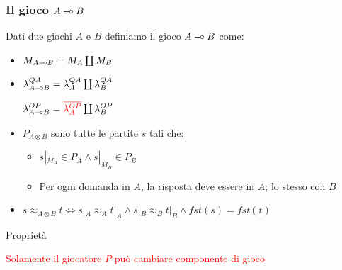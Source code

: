 \documentclass{beamer}
\newcommand{\limp}{\mathbin{{-}\mkern-3.5mu{\circ}}}
\begin{document}
\begin{frame}
	
	\frametitle{Il gioco $A \limp B$}
	Dati due giochi $A$ e $B$ definiamo il gioco $A\limp B$ come:
	\begin{itemize}
		\item<2-> $M_{A\limp B}=M_A \coprod M_B$
		\item<3-> $\lambda^{QA}_{A\limp B}=\lambda^{QA}_A \coprod \lambda^{QA}_B$
		
		$\lambda^{OP}_{A\limp B}=\textcolor{red}{\overline{\lambda^{OP}_A}} \coprod \lambda^{OP}_B$
		\item<4-> $P_{A\otimes B}$ sono tutte le partite $s$ tali che:
		\begin{itemize}
			\item $s|_{M_A} \in P_A \wedge s|_{M_B} \in P_B$
			\item Per ogni domanda in $A$, la risposta deve essere in $A$; lo stesso con $B$
		\end{itemize}
		\item<5-> $s\approx_{A\otimes B} t \Leftrightarrow s|_A \approx_A t|_A \wedge s|_B \approx_B t|_B \wedge fst(s)=fst(t)$ 
	\end{itemize}
	\begin{block}{Proprietà}
		
		\textcolor{red}{Solamente il giocatore $P$ può cambiare componente di gioco}
		
	
	\end{block}
	
\end{frame}
\end{document}
